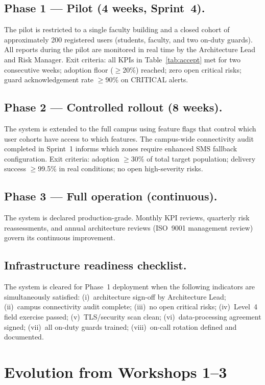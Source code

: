 \documentclass[12pt,a4paper]{article}
\begin{document}
\subsection{Phase 1 --- Pilot (4 weeks, Sprint~4).}
The pilot is restricted to a single faculty building and a closed
cohort of approximately 200 registered users (students, faculty,
and two on-duty guards). All reports during the pilot are
monitored in real time by the Architecture Lead and Risk Manager.
Exit criteria: all KPIs in Table~\ref{tab:accept} met for two
consecutive weeks; adoption floor ($\geq$20\%) reached; zero open
critical risks; guard acknowledgement rate $\geq$90\% on CRITICAL
alerts.

\subsection{Phase 2 --- Controlled rollout (8 weeks).}
The system is extended to the full campus using feature flags that
control which user cohorts have access to which features. The
campus-wide connectivity audit completed in Sprint~1 informs which
zones require enhanced SMS fallback configuration. Exit criteria:
adoption $\geq$30\% of total target population; delivery success
$\geq$99.5\% in real conditions; no open high-severity risks.

\subsection{Phase 3 --- Full operation (continuous).}
The system is declared production-grade. Monthly KPI reviews,
quarterly risk reassessments, and annual architecture reviews
(ISO~9001 management review) govern its continuous improvement.

\subsection{Infrastructure readiness checklist.}
The system is cleared for Phase~1 deployment when the following
indicators are simultaneously satisfied: (i)~architecture sign-off
by Architecture Lead; (ii)~campus connectivity audit complete;
(iii)~no open critical risks; (iv)~Level~4 field exercise passed;
(v)~TLS/security scan clean; (vi)~data-processing agreement signed;
(vii)~all on-duty guards trained; (viii)~on-call rotation defined
and documented.

\section{Evolution from Workshops 1--3}
\end{document}
